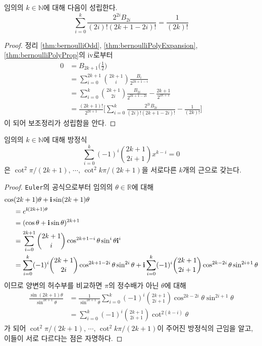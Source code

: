 \begin{lemma}\label{lem:bernoulliSum}
    임의의 $k\in\mathbb{N}$에 대해 다음이 성립한다.
    \begin{equation*}
        \sum_{i=0}^k\frac{2^{2i}B_{2i}}{(2i)!(2k+1-2i)!}=\frac{1}{(2k)!}
    \end{equation*}
\end{lemma}

\begin{proof}
    정리 \ref{thm:bernoulliOdd}, \ref{thm:bernoulliPolyExpansion}, \ref{thm:bernoulliPolyProp}의 iv로부터
    \begin{align*}
        0&=B_{2k+1}\bigg(\frac{1}{2}\bigg)\\
        &=\sum_{i=0}^{2k+1}\binom{2k+1}{i}\frac{B_i}{2^{2k+1-i}}\\
        &=\sum_{i=0}^k\binom{2k+1}{2i}\frac{B_{2i}}{2^{2k+1-2i}}-\frac{2k+1}{2^{2k+1}}\\
        &=\frac{(2k+1)!}{2^{2k+1}}\bigg[\sum_{i=0}^k\frac{2^{2i}B_{2i}}{(2i)!(2k+1-2i)!}-\frac{1}{(2k)!}\bigg]
    \end{align*}
    이 되어 보조정리가 성립함을 안다.
\end{proof}

\begin{lemma}[Papadimitriou]
    임의의 $k\in\mathbb{N}$에 대해 방정식
    \begin{equation*}
        \sum_{i=0}^k(-1)^i\binom{2k+1}{2i+1}x^{k-i}=0
    \end{equation*}
    은 $\cot^2\pi/(2k+1),\,\cdots,\,\cot^2k\pi/(2k+1)$을 서로다른 $k$개의 근으로 갖는다.
\end{lemma}

\begin{proof}
    \texttt{Euler}의 공식으로부터 임의의 $\theta\in\mathbb{R}$에 대해
    \begin{align*}
        \cos&(2k+1)\theta+\mathbf{i}\sin(2k+1)\theta\\
        &=e^{\mathbf{i}(2k+1)\theta}\\
        &=(\cos\theta+\mathbf{i}\sin\theta)^{2k+1}\\
        &=\sum_{i=0}^{2k+1}\binom{2k+1}{i}\cos^{2k+1-i}\theta\sin^i\theta\mathbf{i}^i\\
        &=\sum_{i=0}^k(-1)^i\binom{2k+1}{2i}\cos^{2k+1-2i}\theta\sin^{2i}\theta+\mathbf{i}\sum_{i=0}^k(-1)^i\binom{2k+1}{2i+1}\cos^{2k-2i}\theta\sin^{2i+1}\theta
    \end{align*}
    이므로 양변의 허수부를 비교하면 $\pi$의 정수배가 아닌 $\theta$에 대해
    \begin{align*}
        \frac{\sin(2k+1)\theta}{\sin^{2k+1}\theta}&=\frac{1}{\sin^{2k+1}\theta}\sum_{i=0}^k(-1)^i\binom{2k+1}{2i+1}\cos^{2k-2i}\theta\sin^{2i+1}\theta\\
        &=\sum_{i=0}^k(-1)^i\binom{2k+1}{2i+1}\cot^{2(k-i)}\theta
    \end{align*}
    가 되어 $\cot^2\pi/(2k+1),\,\cdots,\,\cot^2k\pi/(2k+1)$이 주어진 방정식의 근임을 알고, 이들이 서로 다르다는 점은 자명하다.
\end{proof}

